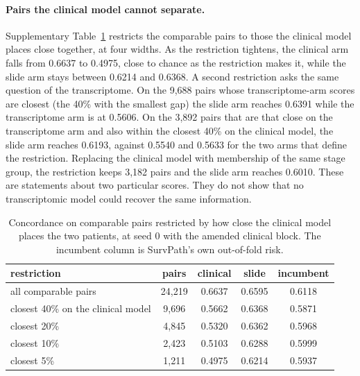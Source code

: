 \documentclass[11pt]{article}
\begin{document}
\paragraph{Pairs the clinical model cannot separate.} Supplementary
Table~\ref{tab:ties} restricts the comparable pairs to those the clinical model places close
together, at four widths. As the restriction tightens, the clinical arm falls from 0.6637 to
0.4975, close to chance as the restriction makes it, while the slide arm stays between 0.6214 and 0.6368. A second restriction asks the same question
of the transcriptome. On the 9,688 pairs whose transcriptome-arm scores are closest (the 40\% with
the smallest gap) the slide arm reaches 0.6391 while the transcriptome arm is at 0.5606. On the
3,892 pairs that are that close on the transcriptome arm and also within the closest 40\% on the
clinical model, the slide arm reaches 0.6193, against 0.5540 and 0.5633 for the two arms that define
the restriction. Replacing the clinical model with membership of the same stage group, the
restriction keeps 3,182 pairs and the slide arm reaches 0.6010. These are statements about two
particular scores. They do not show that no transcriptomic model could recover the same information.

\begin{table}[h]
\centering
{\small
\begin{tabular}{lcccc}
\toprule
restriction & pairs & clinical & slide & incumbent \\
\midrule
all comparable pairs & 24,219 & 0.6637 & 0.6595 & 0.6118 \\
closest 40\% on the clinical model & 9,696 & 0.5662 & 0.6368 & 0.5871 \\
closest 20\% & 4,845 & 0.5320 & 0.6362 & 0.5968 \\
closest 10\% & 2,423 & 0.5103 & 0.6288 & 0.5999 \\
closest 5\% & 1,211 & 0.4975 & 0.6214 & 0.5937 \\
\bottomrule
\end{tabular}}
\caption{Concordance on comparable pairs restricted by how close the clinical model places the two
patients, at seed 0 with the amended clinical block. The incumbent column is SurvPath's own
out-of-fold risk.}
\label{tab:ties}
\end{table}
\end{document}
